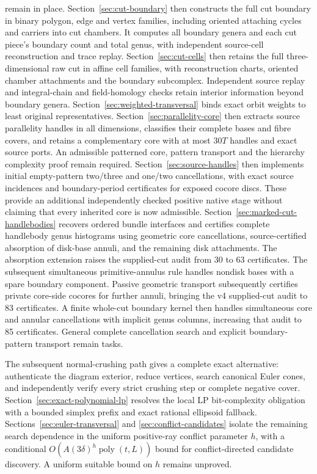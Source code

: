 \documentclass[11pt]{article}
\theoremstyle{remark}
\begin{document}
remain in place.
Section~\ref{sec:cut-boundary} then constructs the full cut boundary in
binary polygon, edge and vertex families, including oriented attaching
cycles and carriers into cut chambers. It computes all boundary genera and
each cut piece's boundary count and total genus, with independent source-cell
reconstruction and trace replay.
Section~\ref{sec:cut-cells} then retains the full three-dimensional raw cut
in affine cell families, with reconstruction charts, oriented chamber
attachments and the boundary subcomplex. Independent source replay and
integral-chain and field-homology checks retain interior information beyond
boundary genera. Section~\ref{sec:weighted-transversal} binds exact orbit
weights to least original representatives. Section~\ref{sec:parallelity-core}
then extracts source parallelity handles in all dimensions, classifies their
complete bases and fibre covers, and retains a complementary core with at
most $30T$ handles and exact source ports. An admissible patterned core,
pattern transport and the hierarchy complexity proof remain required.
Section~\ref{sec:source-handles} then implements initial empty-pattern
two/three and one/two cancellations, with exact source incidences and
boundary-period certificates for exposed cocore discs. These provide an
additional independently checked positive native stage without claiming
that every inherited core is now admissible.
Section~\ref{sec:marked-cut-handlebodies} recovers ordered bundle interfaces
and certifies complete handlebody genus histograms using geometric core
cancellations, source-certified absorption of disk-base annuli, and the
remaining disk attachments. The absorption extension raises the supplied-cut
audit from 30 to 63 certificates. The subsequent simultaneous primitive-annulus rule handles nondisk bases
with a spare boundary component. Passive geometric transport subsequently
certifies private core-side cocores for further annuli, bringing the
v4 supplied-cut audit to 83 certificates. A finite whole-cut boundary kernel
then handles simultaneous core and annular cancellations with implicit genus
columns, increasing that audit to 85 certificates. General complete
cancellation search and explicit boundary-pattern transport remain tasks.

The subsequent normal-crushing path gives a complete exact alternative:
authenticate the diagram exterior, reduce vertices, search canonical Euler
cones, and independently verify every strict crushing step or complete
negative cover.  Section~\ref{sec:exact-polynomial-lp} resolves the local
LP bit-complexity obligation with a bounded simplex prefix and exact
rational ellipsoid fallback.  Sections~\ref{sec:euler-transversal} and
\ref{sec:conflict-candidates} isolate the remaining search dependence in
the uniform positive-ray conflict parameter $h$, with a conditional
$O(A(3\delta)^h\operatorname{poly}(t,L))$ bound for conflict-directed
candidate discovery.  A uniform suitable bound on $h$ remains unproved.
\end{document}
